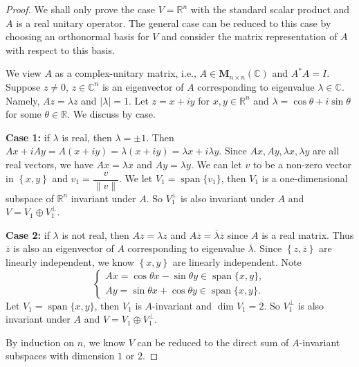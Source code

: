 \documentclass{ctexart}
\newcommand{\M}{\mathbf{M}}
\newcommand{\R}{\mathbb{R}}
\newcommand{\C}{\mathbb{C}}
\begin{document}
    \begin{proof}
        We shall only prove the case $V=\R^n$ with the standard scalar product and $A$ is a real unitary operator. The general case can be reduced to this case by choosing an orthonormal basis for $V$ and consider the matrix representation of $A$ with respect to this basis.

        We view $A$ as a complex-unitary matrix, i.e., $A\in \M_{n\times n}(\C)$ and $A^* A = I$. Suppose $z\ne 0$, $z\in \C^n$ is an eigenvector of $A$ corresponding to eigenvalue $\lambda \in \C$. Namely, $A z = \lambda z$ and $|\lambda|=1$. Let $z = x + i y$ for $x,y\in \R^n$ and $\lambda = \cos\theta + i\sin \theta$ for some $\theta\in \R$. We discuss by case.

        \textbf{Case 1:} if $\lambda$ is real, then $\lambda = \pm 1$. Then $Ax + iAy = A(x+iy) = \lambda (x+iy) = \lambda x + i \lambda y$. Since $Ax, Ay, \lambda x, \lambda y$ are all real vectors, we have $Ax = \lambda x$ and $Ay = \lambda y$. We can let $v$ to be a non-zero vector in $\left\{ x,y \right\}$ and $v_1 = \dfrac{v}{\| v \|}$. We let $V_1 = \operatorname{span} \{ v_1 \}$, then $V_1$ is a one-dimensional subspace of $\R^n$ invariant under $A$. So $V_1^\perp$ is also invariant under $A$ and $V=V_1 \oplus V_1^\perp$.

        \textbf{Case 2:} if $\lambda$ is not real, then $A z = \lambda z$ and $A \overline{z} = \overline{\lambda} \overline{z}$ since $A$ is a real matrix. Thus $\overline{z}$ is also an eigenvector of $A$ corresponding to eigenvalue $\overline{\lambda}$. Since $\left\{ z,\overline{z} \right\}$ are linearly independent, we know $\left\{ x,y \right\}$ are linearly independent. Note
        $$\begin{cases}
            A x = \cos\theta x - \sin\theta y \in \operatorname{span}\{x,y\},\\
            A y = \sin\theta x + \cos\theta y \in \operatorname{span}\{x,y\}.
        \end{cases}
        $$
        Let $V_1 = \operatorname{span} \{ x,y \}$, then $V_1$ is $A$-invariant and $\dim V_1 = 2$. So $V_1^\perp$ is also invariant under $A$ and $V=V_1 \oplus V_1^\perp$.
        
        By induction on $n$, we know $V$ can be reduced to the direct sum of $A$-invariant subspaces with dimension $1$ or $2$.
    \end{proof}
\end{document}
